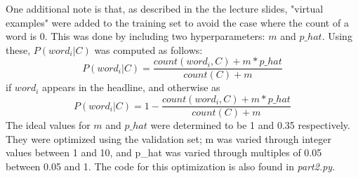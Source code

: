 \documentclass{article}
\theoremstyle{mytheor}
\theoremstyle{definition}
\begin{document}
One additional note is that, as described in the the lecture slides, "virtual examples" were added to the training set to avoid the case where the count of a word is 0. This was done by including two hyperparameters: $m$ and $p\_hat$. Using these, $P(word_i|C)$ was computed as follows:
$$P(word_i|C)=\frac{count(word_i,C) + m*p\_hat}{count(C)+m} $$ if $word_i$ appears in the headline, and otherwise as
$$P(word_i|C)=1-\frac{count(word_i,C) + m*p\_hat}{count(C)+m} $$
The ideal values for $m$ and $p\_hat$ were determined to be 1 and 0.35 respectively. They were optimized using the validation set; m was varied through integer values between 1 and 10, and p\_hat was varied through multiples of 0.05 between 0.05 and 1. The code for this optimization is also found in \textit{part2.py}.\\
\end{document}
